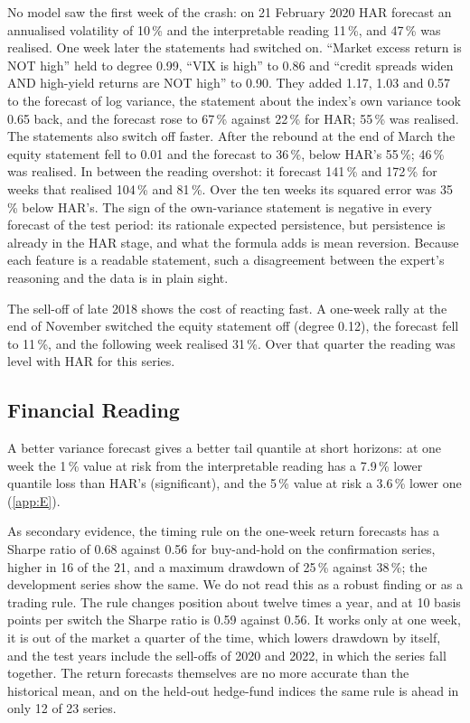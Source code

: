 \documentclass[review]{elsarticle}
\begin{document}
No model saw the first week of the crash: on 21 February 2020 HAR forecast an annualised volatility of 10\,\% and the interpretable reading 11\,\%, and 47\,\% was realised. One week later the statements had switched on. ``Market excess return is NOT high'' held to degree 0.99, ``VIX is high'' to 0.86 and ``credit spreads widen AND high-yield returns are NOT high'' to 0.90. They added 1.17, 1.03 and 0.57 to the forecast of log variance, the statement about the index's own variance took 0.65 back, and the forecast rose to 67\,\% against 22\,\% for HAR; 55\,\% was realised. The statements also switch off faster. After the rebound at the end of March the equity statement fell to 0.01 and the forecast to 36\,\%, below HAR's 55\,\%; 46\,\% was realised. In between the reading overshot: it forecast 141\,\% and 172\,\% for weeks that realised 104\,\% and 81\,\%. Over the ten weeks its squared error was 35\,\% below HAR's. The sign of the own-variance statement is negative in every forecast of the test period: its rationale expected persistence, but persistence is already in the HAR stage, and what the formula adds is mean reversion. Because each feature is a readable statement, such a disagreement between the expert's reasoning and the data is in plain sight.

The sell-off of late 2018 shows the cost of reacting fast. A one-week rally at the end of November switched the equity statement off (degree 0.12), the forecast fell to 11\,\%, and the following week realised 31\,\%. Over that quarter the reading was level with HAR for this series.

\subsection{Financial Reading}\label{sec:6.4}

A better variance forecast gives a better tail quantile at short horizons: at one week the 1\,\% value at risk from the interpretable reading has a 7.9\,\% lower quantile loss than HAR's (significant), and the 5\,\% value at risk a 3.6\,\% lower one (\ref{app:E}).

As secondary evidence, the timing rule on the one-week return forecasts has a Sharpe ratio of 0.68 against 0.56 for buy-and-hold on the confirmation series, higher in 16 of the 21, and a maximum drawdown of 25\,\% against 38\,\%; the development series show the same. We do not read this as a robust finding or as a trading rule. The rule changes position about twelve times a year, and at 10 basis points per switch the Sharpe ratio is 0.59 against 0.56. It works only at one week, it is out of the market a quarter of the time, which lowers drawdown by itself, and the test years include the sell-offs of 2020 and 2022, in which the series fall together. The return forecasts themselves are no more accurate than the historical mean, and on the held-out hedge-fund indices the same rule is ahead in only 12 of 23 series.
\end{document}
